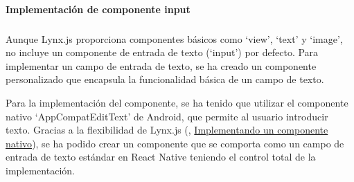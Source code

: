 \paragraph{Implementación de componente input}
\subparagraph{}

Aunque Lynx.js proporciona componentes básicos como `view', `text' y `image', no incluye un componente de entrada de texto (`input') por defecto.
Para implementar un campo de entrada de texto, se ha creado un componente personalizado que encapsula la funcionalidad básica de un campo de texto.

Para la implementación del componente, se ha tenido que utilizar el componente nativo `AppCompatEditText' de Android, que permite al usuario introducir texto.
Gracias a la flexibilidad de Lynx.js (\cite{lynx-documentation}, \href{https://lynxjs.org/guide/custom-native-component.html#platform=android}{Implementando un componente nativo}), se ha podido crear un componente que se comporta como un campo de entrada de texto estándar en React Native teniendo el control total de la implementación.
